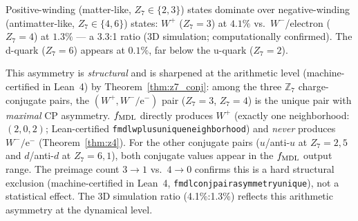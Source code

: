 \documentclass[11pt]{article}
\theoremstyle{remark}
\newcommand{\lean}[1]{%
  \penalty-100
  \begingroup\def\_{\textunderscore\allowbreak}\texttt{#1}\endgroup}
\begin{document}
Positive-winding (matter-like, $Z_7 \in \{2,3\}$) states dominate over
negative-winding (antimatter-like, $Z_7 \in \{4,6\}$) states:
$W^+$ ($Z_7 = 3$) at $4.1\%$ vs.\ $W^-$/electron ($Z_7 = 4$) at $1.3\%$ --- a 3.3:1 ratio
(3D simulation; computationally confirmed).
The d-quark ($Z_7 = 6$) appears at $0.1\%$, far below the u-quark ($Z_7 = 2$).

This asymmetry is \emph{structural} and is sharpened at the arithmetic level (machine-certified in Lean~4) by
Theorem~\ref{thm:z7_conj}: among the three $\mathbb{Z}_7$ charge-conjugate pairs, the
$(W^+, W^-/\mathrm{e}^-)$ pair ($Z_7=3$, $Z_7=4$) is the unique pair with \emph{maximal}
CP asymmetry. $f_{\rm MDL}$ directly produces $W^+$ (exactly one neighborhood:
$(2,0,2)$; Lean-certified \lean{fmdl\_w\_plus\_unique\_neighborhood}) and
\emph{never} produces $W^-/\mathrm{e}^-$ (Theorem~\ref{thm:z4}).
For the other conjugate pairs ($u$/anti-$u$ at $Z_7=2,5$ and $d$/anti-$d$ at $Z_7=6,1$),
both conjugate values appear in the $f_{\rm MDL}$ output range.
The preimage count $3\!\to\!1$ vs.\ $4\!\to\!0$ confirms this is a hard structural
exclusion (machine-certified in Lean~4, \lean{fmdl\_conj\_pair\_asymmetry\_unique}), not a statistical effect.
The 3D simulation ratio (4.1\%:1.3\%) reflects this arithmetic asymmetry at the dynamical level.
\end{document}
